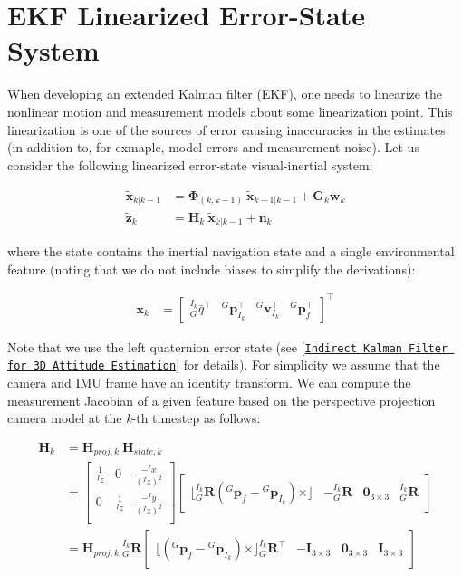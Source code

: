 \hypertarget{fej_fej-sys-evolution}{}\section{E\+K\+F Linearized Error-\/\+State System}\label{fej_fej-sys-evolution}
When developing an extended Kalman filter (E\+KF), one needs to linearize the nonlinear motion and measurement models about some linearization point. This linearization is one of the sources of error causing inaccuracies in the estimates (in addition to, for exmaple, model errors and measurement noise). Let us consider the following linearized error-\/state visual-\/inertial system\+:

\begin{align*} \tilde{\mathbf{x}}_{k|k-1} &= \mathbf{\Phi}_{(k,k-1)}~\tilde{\mathbf{x}}_{k-1|k-1} + \mathbf{G}_{k}\mathbf{w}_{k} \\ \tilde{\mathbf{z}}_{k} &= \mathbf{H}_{k}~\tilde{\mathbf{x}}_{k|k-1}+\mathbf{n}_{k} \end{align*}

where the state contains the inertial navigation state and a single environmental feature (noting that we do not include biases to simplify the derivations)\+:

\begin{align*} \mathbf{x}_k &= \begin{bmatrix} {}_G^{I_{k}} \bar{q}{}^{\top} & {}^G\mathbf{p}_{{I}_{k}}^{\top} & {}^G\mathbf{v}_{{I}_{k}}^{\top} & {}^G\mathbf{p}_{f}^{\top} \end{bmatrix}^{\top} \end{align*}

Note that we use the left quaternion error state (see \mbox{[}\href{http://mars.cs.umn.edu/tr/reports/Trawny05b.pdf}{\tt Indirect Kalman Filter for 3D Attitude Estimation}\mbox{]} \cite{Trawny2005TR} for details). For simplicity we assume that the camera and I\+MU frame have an identity transform. We can compute the measurement Jacobian of a given feature based on the perspective projection camera model at the {\itshape k}-\/th timestep as follows\+:

\begin{align*} \mathbf{H}_{k} &= \mathbf H_{proj,k}~\mathbf H_{state,k} \\ &= \begin{bmatrix} \frac{1}{{}^Iz} & 0 & \frac{-{}^Ix}{({}^Iz)^2} \\ 0 & \frac{1}{{}^Iz} & \frac{-{}^Iy}{({}^Iz)^2} \\ \end{bmatrix} \begin{bmatrix} \lfloor {}^{I_k}_{G}\mathbf{R}({}^{G}\mathbf{p}_f-{}^{G}\mathbf{p}_{I_k}) \times\rfloor & -{}^{I_k}_{G}\mathbf{R} & \mathbf 0_{3\times3} & {}^{I_k}_{G}\mathbf{R} \end{bmatrix} \\ &= \mathbf H_{proj,k}~ {}^{I_k}_{G}\mathbf{R} \begin{bmatrix} \lfloor ({}^{G}\mathbf{p}_f-{}^{G}\mathbf{p}_{I_k}) \times\rfloor {}^{I_k}_{G}\mathbf{R}^\top & -\mathbf I_{3\times3} & \mathbf 0_{3\times3} & \mathbf I_{3\times3} \end{bmatrix} \end{align*}

